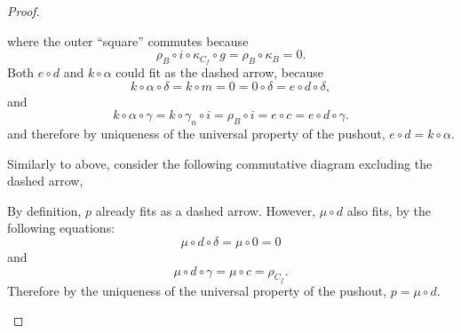\begin{proof}
\begin{enumerate}[label={(\bfseries TR\arabic*)}]
{\begin{center}
            \end{center}
            where the outer ``square'' commutes because
            \[
                \rho_B \circ i \circ \kappa_{C_f} \circ g = \rho_B \circ \kappa_B = 0.
            \]
            Both \( e \circ d \) and \( k \circ \alpha \) could fit as the dashed arrow, because
            \[
                k \circ \alpha \circ \delta = k \circ m = 0 = 0 \circ \delta = e \circ d \circ \delta,
            \]
            and
            \[
                k \circ \alpha \circ \gamma = k \circ \gamma_n \circ i = \rho_B \circ i = e \circ c = e \circ d \circ \gamma.
            \]
            and therefore by uniqueness of the universal property of the pushout, \( e \circ d = k \circ \alpha \).

            Similarly to above, consider the following commutative diagram excluding the dashed arrow,
            \begin{center}
            \end{center}

            By definition, \( p \) already fits as a dashed arrow. However, \( \mu \circ d \) also fits, by the following equations:
            \[
                \mu \circ d \circ \delta = \mu \circ 0 = 0
            \]
            and
            \[
               \mu \circ d \circ \gamma = \mu \circ c = \rho_{C_f}.
            \]
            Therefore by the uniqueness of the universal property of the pushout, \( p = \mu \circ d \).

}
\end{enumerate}
\end{proof}
